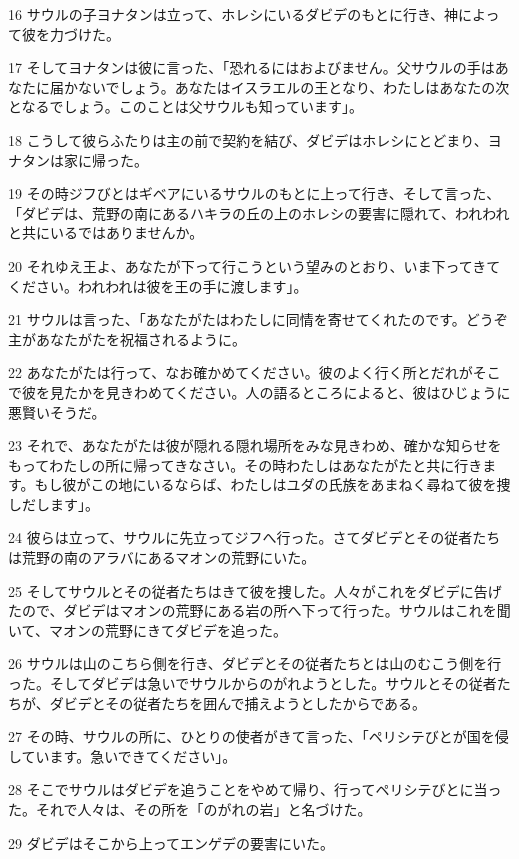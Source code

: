 \par 16 サウルの子ヨナタンは立って、ホレシにいるダビデのもとに行き、神によって彼を力づけた。
\par 17 そしてヨナタンは彼に言った、「恐れるにはおよびません。父サウルの手はあなたに届かないでしょう。あなたはイスラエルの王となり、わたしはあなたの次となるでしょう。このことは父サウルも知っています」。
\par 18 こうして彼らふたりは主の前で契約を結び、ダビデはホレシにとどまり、ヨナタンは家に帰った。
\par 19 その時ジフびとはギベアにいるサウルのもとに上って行き、そして言った、「ダビデは、荒野の南にあるハキラの丘の上のホレシの要害に隠れて、われわれと共にいるではありませんか。
\par 20 それゆえ王よ、あなたが下って行こうという望みのとおり、いま下ってきてください。われわれは彼を王の手に渡します」。
\par 21 サウルは言った、「あなたがたはわたしに同情を寄せてくれたのです。どうぞ主があなたがたを祝福されるように。
\par 22 あなたがたは行って、なお確かめてください。彼のよく行く所とだれがそこで彼を見たかを見きわめてください。人の語るところによると、彼はひじょうに悪賢いそうだ。
\par 23 それで、あなたがたは彼が隠れる隠れ場所をみな見きわめ、確かな知らせをもってわたしの所に帰ってきなさい。その時わたしはあなたがたと共に行きます。もし彼がこの地にいるならば、わたしはユダの氏族をあまねく尋ねて彼を捜しだします」。
\par 24 彼らは立って、サウルに先立ってジフへ行った。さてダビデとその従者たちは荒野の南のアラバにあるマオンの荒野にいた。
\par 25 そしてサウルとその従者たちはきて彼を捜した。人々がこれをダビデに告げたので、ダビデはマオンの荒野にある岩の所へ下って行った。サウルはこれを聞いて、マオンの荒野にきてダビデを追った。
\par 26 サウルは山のこちら側を行き、ダビデとその従者たちとは山のむこう側を行った。そしてダビデは急いでサウルからのがれようとした。サウルとその従者たちが、ダビデとその従者たちを囲んで捕えようとしたからである。
\par 27 その時、サウルの所に、ひとりの使者がきて言った、「ペリシテびとが国を侵しています。急いできてください」。
\par 28 そこでサウルはダビデを追うことをやめて帰り、行ってペリシテびとに当った。それで人々は、その所を「のがれの岩」と名づけた。
\par 29 ダビデはそこから上ってエンゲデの要害にいた。

